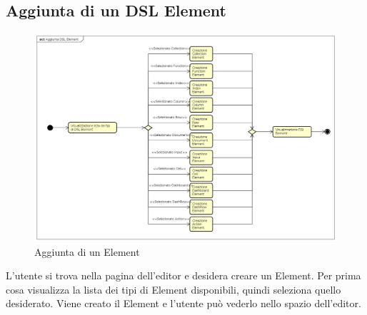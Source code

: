     \subsection{Aggiunta di un DSL Element}
    \begin{figure}[H]
      \centering
      \includegraphics[width=1.0\textwidth]{res/img/aggiuntaDSLElement.png}
      \caption{Aggiunta di un  Element}
      \label{fig:diagram_model}
    \end{figure}
    L'utente si trova nella pagina dell'editor e desidera creare un  Element. Per prima cosa visualizza la lista dei tipi di  Element disponibili, quindi seleziona quello desiderato. Viene creato il  Element e l'utente può vederlo nello spazio dell'editor.
